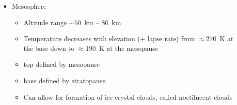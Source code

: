 \documentclass[11pt, oneside]{article}
\begin{document}
\begin{itemize}
\begin{itemize}
\begin{itemize}
			\item[--] top is defined by exobase (a.k.a.\ thermopause)
			\item[--] bottom defined by mesopause
			\item[--] Importantly for RS applications, ionosphere is located at the bottom of thermosphere
			\item[--] ionosphere is the ionized layer of Earth's atmosphere; plays a key role in EM wave propagation from satellites and radio propagation on Earth
			\item[--] ionosphere is a layer of free electrons; electrons are stripped from atoms and molecules of the atmosphere by ultraviolet and higher frequency radiation from the Sun; electrons remain free for some time due to low density of thermosphere; eventually, electron will be recaptured by a positive ion (process called recombination); low density enables rate of release of electrons ${\sim}$ rate of recombination with positive ions $\Rightarrow$ persistent plasma (ionosphere) with temporal variability
			\item[--] ionosphere is \underline{dispersive} at microwave frequencies, enables detailed studies using dual-frequency GPS
			\item[--] Strongest influence on RS is at very high and low (microwave and lower) frequencies
		\end{itemize}
		\item Mesosphere
		\begin{itemize}
			\item[--] Altitude range ${\sim}50$~km -- 80~km
			\item[--] Temperature decreases with elevation ($+$ lapse rate) from ${\approx}270$~K at the base down to ${\approx}190$~K at the mesopause
			\item[--] top defined by mesopause
			\item[--] base defined by stratopause
			\item[--] Can allow for formation of ice-crystal clouds, called noctilucent clouds

\end{itemize}
\end{itemize}
\end{itemize}
\end{document}
